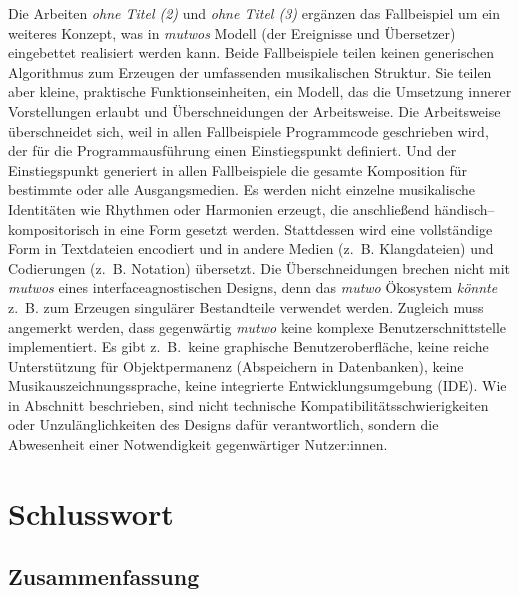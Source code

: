 \documentclass[12pt,a4paper,ngerman]{article}
\begin{document}
Die Arbeiten \emph{ohne Titel (2)} und  \emph{ohne Titel (3)} ergänzen das Fallbeispiel  um ein weiteres Konzept, was in \emph{mutwos} Modell (der Ereignisse und Übersetzer) eingebettet realisiert werden kann.
Beide Fallbeispiele teilen keinen generischen Algorithmus zum Erzeugen der umfassenden musikalischen Struktur.
Sie teilen aber kleine, praktische Funktionseinheiten, ein Modell, das die Umsetzung innerer Vorstellungen erlaubt und Überschneidungen der Arbeitsweise.
Die Arbeitsweise überschneidet sich, weil in allen Fallbeispiele Programmcode geschrieben wird, der für die Programmausführung einen Einstiegspunkt definiert.
Und der Einstiegspunkt generiert in allen Fallbeispiele die gesamte Komposition für bestimmte oder alle Ausgangsmedien.
Es werden nicht einzelne musikalische Identitäten wie Rhythmen oder Harmonien erzeugt, die anschließend händisch--kompositorisch in eine Form gesetzt werden.
Stattdessen wird eine vollständige Form in Textdateien encodiert und in andere Medien (z.~B. Klangdateien) und Codierungen (z.~B. Notation) übersetzt.
Die Überschneidungen brechen nicht mit \emph{mutwos} \emph{} eines interfaceagnostischen Designs, denn das \emph{mutwo} Ökosystem \emph{könnte} z.~B. zum Erzeugen singulärer Bestandteile verwendet werden.
Zugleich muss angemerkt werden, dass gegenwärtig  \emph{mutwo} keine komplexe Benutzerschnittstelle implementiert. 
Es gibt z.~B.\ keine graphische Benutzeroberfläche, keine reiche Unterstützung für Objektpermanenz (Abspeichern in Datenbanken), keine Musikauszeichnungssprache, keine integrierte Entwicklungsumgebung (IDE).
Wie in Abschnitt \emph{} beschrieben, sind nicht technische Kompatibilitätsschwierigkeiten oder Unzulänglichkeiten des Designs dafür verantwortlich, sondern die Abwesenheit einer Notwendigkeit gegenwärtiger Nutzer:innen.


\section{Schlusswort}

\subsection{Zusammenfassung}
\end{document}
